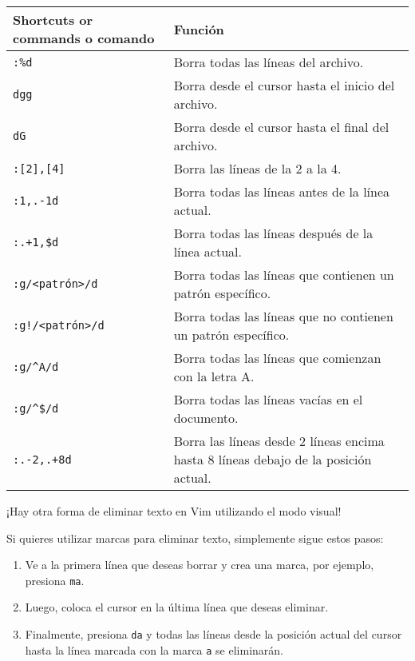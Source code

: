 \documentclass[
  doc,
  floatsintext,
  longtable,
  a4paper,
  nolmodern,
  notxfonts,
  notimes,
  colorlinks=true,linkcolor=blue,citecolor=blue,urlcolor=blue]{apa7}
\providecommand{\tightlist}{%
  \setlength{\itemsep}{0pt}\setlength{\parskip}{0pt}}
\begin{document}
\begin{longtable}[]{@{}
  >{\raggedright\arraybackslash}p{}
  >{\raggedright\arraybackslash}p{}@{}}
\toprule\noalign{}
\begin{minipage}[b]{\linewidth}\raggedright
Shortcuts or commands o comando
\end{minipage} & \begin{minipage}[b]{\linewidth}\raggedright
Función
\end{minipage} \\
\midrule\noalign{}
\endhead
\bottomrule\noalign{}
\endlastfoot
\texttt{:\%d} & Borra todas las líneas del archivo. \\
\texttt{dgg} & Borra desde el cursor hasta el inicio del archivo. \\
\texttt{dG} & Borra desde el cursor hasta el final del archivo. \\
\texttt{:{[}2{]},{[}4{]}} & Borra las líneas de la 2 a la 4. \\
\texttt{:1,.-1d} & Borra todas las líneas antes de la línea actual. \\
\texttt{:.+1,\$d} & Borra todas las líneas después de la línea
actual. \\
\texttt{:g/\textless{}patrón\textgreater{}/d} & Borra todas las líneas
que contienen un patrón específico. \\
\texttt{:g!/\textless{}patrón\textgreater{}/d} & Borra todas las líneas
que no contienen un patrón específico. \\
\texttt{:g/\^{}A/d} & Borra todas las líneas que comienzan con la letra
A. \\
\texttt{:g/\^{}\$/d} & Borra todas las líneas vacías en el documento. \\
\texttt{:.-2,.+8d} & Borra las líneas desde 2 líneas encima hasta 8
líneas debajo de la posición actual. \\
\end{longtable}

¡Hay otra forma de eliminar texto en Vim utilizando el modo visual!

Si quieres utilizar marcas para eliminar texto, simplemente sigue estos
pasos:

\begin{enumerate}
\def\labelenumi{\arabic{enumi}.}
\tightlist
\item
  Ve a la primera línea que deseas borrar y crea una marca, por ejemplo,
  presiona \texttt{ma}.
\item
  Luego, coloca el cursor en la última línea que deseas eliminar.
\item
  Finalmente, presiona \texttt{d\textquotesingle{}a} y todas las líneas
  desde la posición actual del cursor hasta la línea marcada con la
  marca \texttt{a} se eliminarán.
\end{enumerate}
\end{document}
